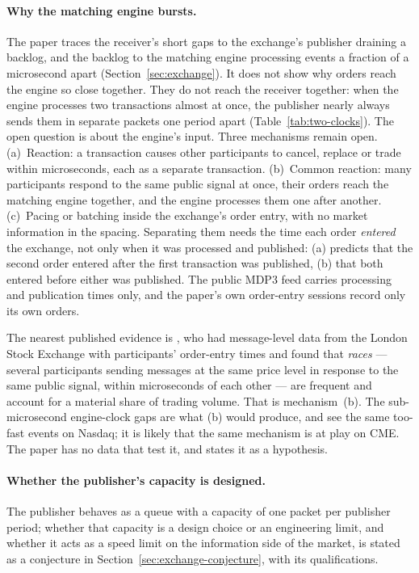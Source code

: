 \documentclass[11pt]{article}
\begin{document}
\paragraph{Why the matching engine bursts.} The paper traces the receiver's short gaps
to the exchange's publisher draining a backlog, and the backlog to the matching engine
processing events a fraction of a microsecond apart (Section~\ref{sec:exchange}). It does
not show why orders reach the engine so close together. They do not reach the receiver
together: when the engine processes two transactions almost at once, the publisher nearly
always sends them in separate packets one period apart (Table~\ref{tab:two-clocks}). The
open question is about the engine's input. Three mechanisms remain open. (a)~Reaction:
a transaction causes other participants to cancel, replace or trade within microseconds,
each as a separate transaction. (b)~Common reaction: many participants respond to the
same public signal at once, their orders reach the matching engine together, and the
engine processes them one after another. (c)~Pacing or batching inside the exchange's
order entry, with no market information in the spacing. Separating them needs the time
each order \emph{entered} the exchange, not only when it was processed and published: (a)
predicts that the second order entered after the first transaction was published, (b)
that both entered before either was published. The public MDP3 feed carries processing
and publication times only, and the paper's own order-entry sessions record only its own
orders.

The nearest published evidence is \citet{aquilina2022arms}, who had message-level data
from the London Stock Exchange with participants' order-entry times and found that
\emph{races} --- several participants sending messages at the same price level in response
to the same public signal, within microseconds of each other --- are frequent and account
for a material share of trading volume. That is mechanism~(b). The sub-microsecond
engine-clock gaps are what (b) would produce, and \citet{noble2026realitygap} see the same
too-fast events on Nasdaq; it is likely that the same mechanism is at play on CME. The
paper has no data that test it, and states it as a hypothesis.

\paragraph{Whether the publisher's capacity is designed.} The publisher behaves as a queue
with a capacity of one packet per publisher period; whether that capacity is a
design choice or an engineering limit, and whether it acts as a speed limit on the
information side of the market, is stated as a conjecture in
Section~\ref{sec:exchange-conjecture}, with its qualifications.
\end{document}
